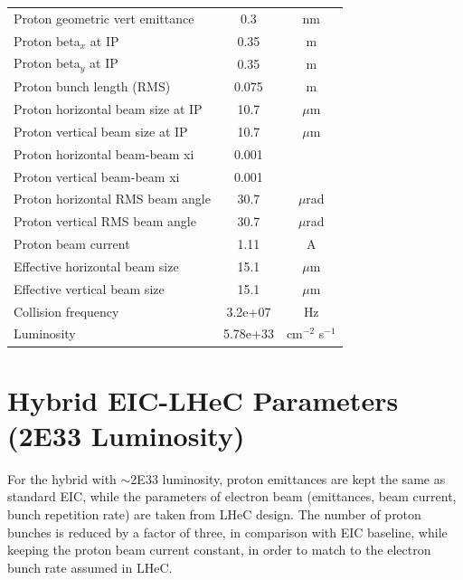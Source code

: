 \documentclass{article}
\begin{document}
\begin{longtable}{lcc}
Proton geometric vert emittance & 0.3 & nm \\
Proton beta$_x$ at IP & 0.35 & m \\
Proton beta$_y$ at IP & 0.35 & m \\
Proton bunch length (RMS) & 0.075 & m \\
Proton horizontal beam size at IP & 10.7 & $\mu$m \\
Proton vertical beam size at IP & 10.7 & $\mu$m \\
Proton horizontal beam-beam xi & 0.001 &  \\
Proton vertical beam-beam xi & 0.001 &  \\
Proton horizontal RMS beam angle & 30.7 & $\mu$rad \\
Proton vertical RMS beam angle & 30.7 & $\mu$rad \\
Proton beam current & 1.11 & A \\
Effective horizontal beam size & 15.1 & $\mu$m \\
Effective vertical beam size & 15.1 & $\mu$m \\
Collision frequency & 3.2e+07 & Hz \\
Luminosity & 5.78e+33 & cm$^{-2}$ s$^{-1}$ \\
\bottomrule
\end{longtable}


\section{Hybrid EIC-LHeC Parameters (2E33 Luminosity)}

For the hybrid with $\sim$2E33 luminosity, proton emittances are kept the same as standard EIC, while the parameters of electron beam (emittances, beam current, bunch repetition rate) are taken from LHeC design. The number of proton bunches is reduced by a factor of three, in comparison with EIC baseline, while keeping the proton beam current constant, in order to match to the electron bunch rate assumed in LHeC. 
\end{document}
